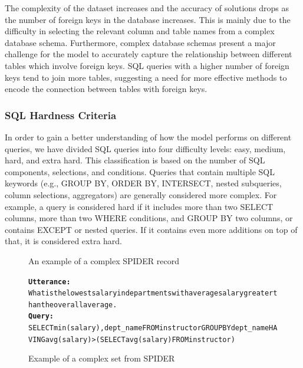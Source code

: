 The complexity of the dataset increases and the accuracy of solutions drops as the number of foreign keys in the database increases. This is mainly due to the difficulty in selecting the relevant column and table names from a complex database schema. Furthermore, complex database schemas present a major challenge for the model to accurately capture the relationship between different tables which involve foreign keys. SQL queries with a higher number of foreign keys tend to join more tables, suggesting a need for more effective methods to encode the connection between tables with foreign keys.

\subsubsection*{SQL Hardness Criteria}

In order to gain a better understanding of how the model performs on different queries, we have divided SQL queries into four difficulty levels: easy, medium, hard, and extra hard. This classification is based on the number of SQL components, selections, and conditions. Queries that contain multiple SQL keywords (e.g., GROUP BY, ORDER BY, INTERSECT, nested subqueries, column selections, aggregators) are generally considered more complex. For example, a query is considered hard if it includes more than two SELECT columns, more than two WHERE conditions, and GROUP BY two columns, or contains EXCEPT or nested queries. If it contains even more additions on top of that, it is considered extra hard.

\begin{figure}[H]
  \label{fig:Spider2}
  \begin{AIbox}{An example of a complex SPIDER record}
      \vspace{-5px}
      \parbox{1\textwidth}{\scriptsize
      \begin{alltt} 
          {\bf Utterance:} \\ 
          What is the lowest salary in departments with average salary greater than the overall average.
          \\
          {\bf Query:} \\
          SELECT min(salary) ,  dept\_name FROM instructor GROUP BY dept\_name HAVING avg(salary)  >  (SELECT avg(salary) FROM instructor)
      \end{alltt}
      }
      \vspace{-5px}
  \end{AIbox}
  \caption{Example of a complex set from SPIDER}
\end{figure}

